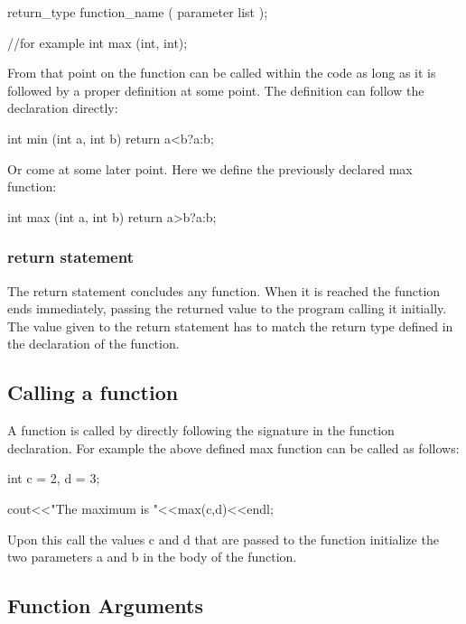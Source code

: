 \documentclass[10pt,a4paper]{scrartcl}
\begin{document}
\begin{multicols*}{2}
\begin{TPCpp}
return_type function_name ( parameter list );

//for example
int max (int, int);
\end{TPCpp}

From that point on the function can be called within the code as long as it is followed by a proper definition at some point. The definition can follow the declaration directly:

\begin{TPCpp}
int min (int a, int b){
	return a<b?a:b;
}
\end{TPCpp}

Or come at some later point. Here we define the previously declared max function:

\begin{TPCpp}
int max (int a, int b){
	return a>b?a:b;
}
\end{TPCpp}

\subsubsection{return statement}

The return statement concludes any function. When it is reached the function ends immediately, passing the returned value to the program calling it initially. The value given to the return statement has to match the return type defined in the declaration of the function.

\subsection{Calling a function}

A function is called by directly following the signature in the function declaration. For example the above defined max function can be called as follows:

\begin{TPCpp}
int c = 2, d = 3;

cout<<"The maximum is "<<max(c,d)<<endl; 
\end{TPCpp}

Upon this call the values c and d that are passed to the function initialize the two parameters a and b in the body of the function.

\subsection{Function Arguments}


\end{multicols*}
\end{document}

